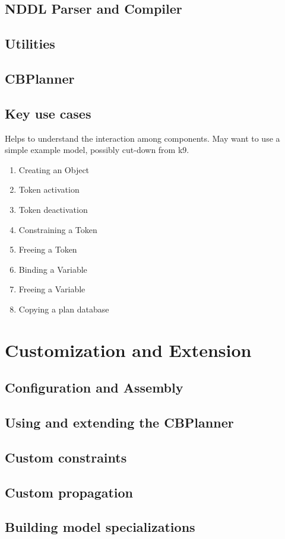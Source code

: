 \documentclass[10pt, letterpaper, twoside]{article}
\begin{document}
\subsection{NDDL Parser and Compiler}
\subsection{Utilities}
\subsection{CBPlanner}
\subsection{Key use cases}
Helps to understand the interaction among components. May want to use a simple example model, possibly cut-down from k9.
\begin{enumerate}
\item Creating an Object
\item Token activation
\item Token deactivation
\item Constraining a Token
\item Freeing a Token
\item Binding a Variable
\item Freeing a Variable
\item Copying a plan database
\end{enumerate}

\section{Customization and Extension}
\subsection{Configuration and Assembly}
\subsection{Using and extending the CBPlanner}
\subsection{Custom constraints}
\subsection{Custom propagation}
\subsection{Building model specializations}
\end{document}
